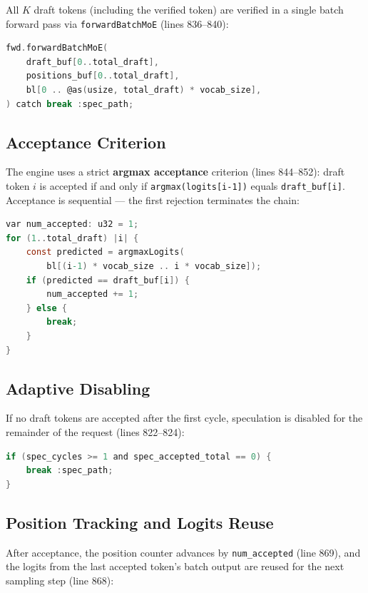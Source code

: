 \documentclass[11pt]{article}
\begin{document}
All $K$ draft tokens (including the verified token) are verified in a single
batch forward pass via \texttt{forwardBatchMoE} (lines 836--840):

\begin{lstlisting}[language=C,caption={Batch verification (llama\_toon.zig:836--840)}]
fwd.forwardBatchMoE(
    draft_buf[0..total_draft],
    positions_buf[0..total_draft],
    bl[0 .. @as(usize, total_draft) * vocab_size],
) catch break :spec_path;
\end{lstlisting}

\subsection{Acceptance Criterion}

The engine uses a strict \textbf{argmax acceptance} criterion (lines 844--852):
draft token $i$ is accepted if and only if \texttt{argmax(logits[i-1])} equals
\texttt{draft\_buf[i]}. Acceptance is sequential --- the first rejection
terminates the chain:

\begin{lstlisting}[language=C,caption={Argmax acceptance (llama\_toon.zig:844--852)}]
var num_accepted: u32 = 1;
for (1..total_draft) |i| {
    const predicted = argmaxLogits(
        bl[(i-1) * vocab_size .. i * vocab_size]);
    if (predicted == draft_buf[i]) {
        num_accepted += 1;
    } else {
        break;
    }
}
\end{lstlisting}

\subsection{Adaptive Disabling}

If no draft tokens are accepted after the first cycle, speculation is disabled
for the remainder of the request (lines 822--824):

\begin{lstlisting}[language=C,caption={Adaptive disable (llama\_toon.zig:822--824)}]
if (spec_cycles >= 1 and spec_accepted_total == 0) {
    break :spec_path;
}
\end{lstlisting}

\subsection{Position Tracking and Logits Reuse}

After acceptance, the position counter advances by \texttt{num\_accepted}
(line 869), and the logits from the last accepted token's batch output are
reused for the next sampling step (line 868):
\end{document}
